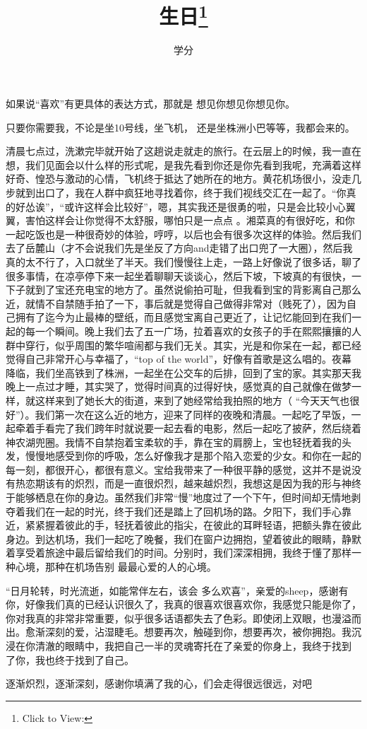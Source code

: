 \documentclass{article}
\title{生日\footnote{Click to View:\url{}}}
\author{学分}
\date{}
\begin{document}

\maketitle


\Large

如果说“喜欢”有更具体的表达方式，那就是
想见你想见你想见你。 

只要你需要我，不论是坐10号线，坐飞机，
还是坐株洲小巴等等，我都会来的。 

清晨七点过，洗漱完毕就开始了这趟说走就走的旅行。在云层上的时候，我一直在想，我们见面会以什么样的形式呢，是我先看到你还是你先看到我呢，充满着这样好奇、惶恐与激动的心情，飞机终于抵达了她所在的地方。黄花机场很小，没走几步就到出口了，我在人群中疯狂地寻找着你，终于我们视线交汇在一起了。“你真的好怂诶”，“或许这样会比较好”，嗯，其实我还是很勇的啦，只是会比较小心翼翼，害怕这样会让你觉得不太舒服，哪怕只是一点点
\newpage
。湘菜真的有很好吃，和你一起吃饭也是一种很奇妙的体验，哼哼，以后也会有很多次这样的体验。然后我们去了岳麓山（才不会说我们先是坐反了方向and走错了出口兜了一大圈），然后我真的太不行了，入口就坐了半天。我们慢慢往上走，一路上好像说了很多话，聊了很多事情，在凉亭停下来一起坐着聊聊天谈谈心，然后下坡，下坡真的有很快，一下子就到了宝还充电宝的地方了。虽然说偷拍可耻，但我看到宝的背影离自己那么近，就情不自禁随手拍了一下，事后就是觉得自己做得非常对（贱死了），因为自己拥有了迄今为止最棒的壁纸，而且感觉宝离自己更近了，让记忆能回到在我们一起的每一个瞬间。晚上我们去了五一广场，拉着喜欢的女孩子的手在熙熙攘攘的人群中穿行，似乎周围的繁华喧闹都与我们无关。其实，光是和你呆在一起，都已经觉得自己非常开心与幸福了，“top of the world”，好像有首歌是这么唱的。夜幕降临，我们坐高铁到了株洲，一起坐在公交车的后排，回到了宝的家。其实那天我晚上一点过才睡，其实哭了，觉得时间真的过得好快，感觉真的自己就像在做梦一样，就这样来到了她长大的街道，来到了她经常给我拍照的地方（
\newpage
“今天天气也很好”）。我们第一次在这么近的地方，迎来了同样的夜晚和清晨。一起吃了早饭，一起牵着手看完了我们跨年时就说要一起去看的电影，然后一起吃了披萨，然后绕着神农湖兜圈。我情不自禁抱着宝柔软的手，靠在宝的肩膀上，宝也轻抚着我的头发，慢慢地感受到你的呼吸，怎么好像我才是那个陷入恋爱的少女。和你在一起的每一刻，都很开心，都很有意义。宝给我带来了一种很平静的感觉，这并不是说没有热恋期该有的炽烈，而是一直很炽烈，越来越炽烈，我想这是因为我的形与神终于能够栖息在你的身边。虽然我们非常“慢”地度过了一个下午，但时间却无情地剥夺着我们在一起的时光，终于我们还是踏上了回机场的路。夕阳下，我们手心靠近，紧紧握着彼此的手，轻抚着彼此的指尖，在彼此的耳畔轻语，把额头靠在彼此身边。到达机场，我们一起吃了晚餐，我们在窗户边拥抱，望着彼此的眼睛，静默着享受着旅途中最后留给我们的时间。分别时，我们深深相拥，我终于懂了那样一种心境，那种在机场告别
最最心爱的人的心境。 

“日月轮转，时光流逝，如能常伴左右，该会
\newpage
多么欢喜”，亲爱的sheep，感谢有你，好像我们真的已经认识很久了，我真的很喜欢很喜欢你，我感觉只能是你了，你对我真的非常非常重要，似乎很多话语都失去了色彩。即使闭上双眼，也漫溢而出。愈渐深刻的爱，沾湿睫毛。想要再次，触碰到你，想要再次，被你拥抱。我沉浸在你清澈的眼睛中，我把自己一半的灵魂寄托在了亲爱的你身上，我终于找到
了你，我也终于找到了自己。 

逐渐炽烈，逐渐深刻，感谢你填满了我的心，们会走得很远很远，对吧
\end{document}
